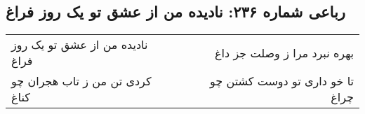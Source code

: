 \begin{center}
\section*{رباعی شماره ۲۳۶: نادیده من از عشق تو یک روز فراغ}
\label{sec:sh236}
\begin{longtable}{l p{0.5cm} r}
نادیده من از عشق تو یک روز فراغ
&&
بهره نبرد مرا ز وصلت جز داغ
\\
کردی تن من ز تاب هجران چو کناغ
&&
تا خو داری تو دوست کشتن چو چراغ
\\
\end{longtable}
\end{center}
